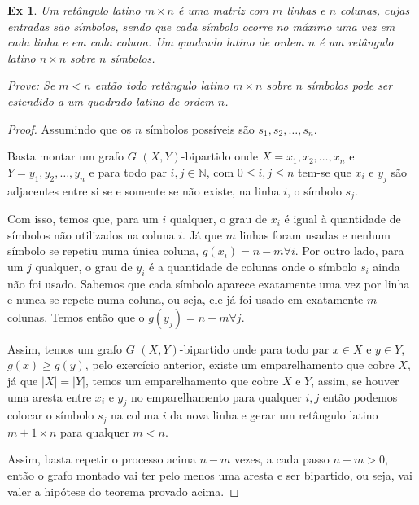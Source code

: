 \documentclass[12pt]{article}
\newcounter{exCounter}
\newtheorem{ex}[exCounter]{Ex}
\begin{document}
\begin{ex}
Um retângulo latino $m \times n$ é uma matriz com $m$ linhas e $n$ colunas, cujas entradas são símbolos, sendo que cada símbolo ocorre no máximo uma vez em cada linha e em cada coluna. Um quadrado latino de ordem $n$ é um retângulo latino $n \times n$ sobre $n$ símbolos.

Prove: Se $m < n$ então todo retângulo latino $m \times n$ sobre $n$ símbolos pode ser estendido a um quadrado latino de ordem $n$.
\end{ex}

\begin{proof}
Assumindo que os $n$ símbolos possíveis são $s_1, s_2, \dots, s_n$.

Basta montar um grafo $G$ $(X,Y)$-bipartido onde $X = {x_1, x_2, \dots, x_n}$ e $Y = {y_1, y_2, \dots, y_n}$ e para todo par $i, j \in \mathbb{N}$, com $0 \leq i,j \leq n$ tem-se que $x_i$ e $y_j$ são adjacentes entre si se e somente se não existe, na linha $i$, o símbolo $s_j$.

Com isso, temos que, para um $i$ qualquer, o grau de $x_i$ é igual à quantidade de símbolos não utilizados na coluna $i$. Já que $m$ linhas foram usadas e nenhum símbolo se repetiu numa única coluna, $g(x_i) = n-m \forall i$. Por outro lado, para um $j$ qualquer, o grau de $y_i$ é a quantidade de colunas onde o símbolo $s_i$ ainda não foi usado. Sabemos que cada símbolo aparece exatamente uma vez por linha e nunca se repete numa coluna, ou seja, ele já foi usado em exatamente $m$ colunas. Temos então que o $g(y_j) = n-m \forall j$.

Assim, temos um grafo $G$ $(X,Y)$-bipartido onde para todo par $x \in X$ e $y \in Y$, $g(x) \geq g(y)$, pelo exercício anterior, existe um emparelhamento que cobre $X$, já que $|X| = |Y|$, temos um emparelhamento que cobre $X$ e $Y$, assim, se houver uma aresta entre $x_i$ e $y_j$ no emparelhamento para qualquer $i,j$ então podemos colocar o símbolo $s_j$ na coluna $i$ da nova linha e gerar um retângulo latino $m+1 \times n$ para qualquer $m < n$.

Assim, basta repetir o processo acima $n-m$ vezes, a cada passo $n-m > 0$, então o grafo montado vai ter pelo menos uma aresta e ser bipartido, ou seja, vai valer a hipótese do teorema provado acima.
\end{proof}
\end{document}
